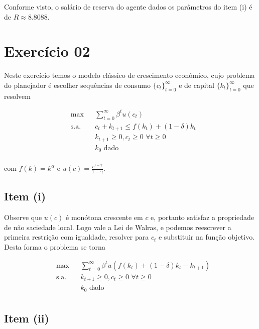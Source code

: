 \documentclass{article}
\begin{document}
Conforme visto, o salário de reserva do agente dados os parâmetros do item (i) é de $R \approx 8.8088$.

\section*{Exercício 02}

Neste exercício temos o modelo clássico de crescimento econômico, cujo problema do planejador
é escolher sequências de consumo $\{c_t\}_{t=0}^{\infty}$ e de capital $\{k_t\}_{t=0}^{\infty}$ que resolvem

\begin{equation}
\begin{aligned}
& \max & & \sum_{t=0}^{\infty} \beta^t u(c_t) \\
& \text{s.a.} & &  c_t + k_{t+1} \leq f(k_t) + (1-\delta) k_t \\
& & &  k_{t+1} \geq 0, c_t \geq 0 \,\, \forall t \geq 0  \\
& & &  k_0 \text{ dado} \\
\end{aligned}
\end{equation}

com $f(k) = k^\alpha$ e $u(c) = \frac{c^{1-\gamma}}{1-\gamma}$.


\subsection*{Item (i)}

Observe que $u(c)$ é monótona crescente em $c$ e, portanto satisfaz a propriedade de não saciedade local.
Logo vale a Lei de Walras, e podemos reescrever a primeira restrição com igualdade,
resolver para $c_t$ e substituir na função objetivo. Desta forma o problema se torna 

\begin{equation}
\begin{aligned}
& \max & & \sum_{t=0}^{\infty} \beta^t u(f(k_t) + (1-\delta) k_t - k_{t+1}) \\
& \text{s.a.} & &  k_{t+1} \geq 0, c_t \geq 0 \,\, \forall t \geq 0  \\
& & &  k_0 \text{ dado} \\
\end{aligned}
\end{equation}

\subsection*{Item (ii)}
\end{document}
